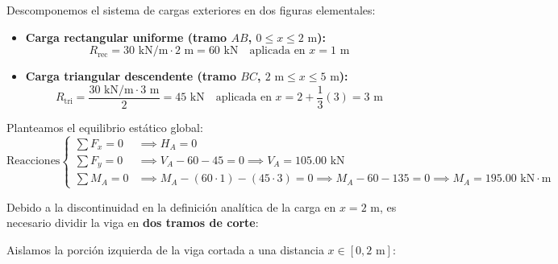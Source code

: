 
Descomponemos el sistema de cargas exteriores en dos figuras elementales:
\begin{itemize}
    \item \textbf{Carga rectangular uniforme (tramo $AB$, $0 \le x \le 2\text{ m}$):}
          \[
              R_{\text{rec}} = 30\text{ kN/m} \cdot 2\text{ m} = 60\text{ kN} \quad \text{aplicada en } x = 1\text{ m}
          \]
    \item \textbf{Carga triangular descendente (tramo $BC$, $2\text{ m} \le x \le 5\text{ m}$):}
          \[
              R_{\text{tri}} = \frac{30\text{ kN/m} \cdot 3\text{ m}}{2} = 45\text{ kN} \quad \text{aplicada en } x = 2 + \frac{1}{3}(3) = 3\text{ m}
          \]
\end{itemize}

Planteamos el equilibrio estático global:
\begin{equation}
    \text{Reacciones} \left\{
    \begin{aligned}
        \sum F_x = 0 & \implies \boxed{H_A = 0}                                                                                                        \\[6pt]
        \sum F_y = 0 & \implies V_A - 60 - 45 = 0 \implies \boxed{V_A = 105.00\text{ kN}}                                                              \\[6pt]
        \sum M_A = 0 & \implies M_A - (60 \cdot 1) - (45 \cdot 3) = 0 \implies M_A - 60 - 135 = 0 \implies \boxed{M_A = 195.00\text{ kN}\cdot\text{m}}
    \end{aligned}
    \right.
\end{equation}


Debido a la discontinuidad en la definición analítica de la carga en $x = 2\text{ m}$, es necesario dividir la viga en \textbf{dos tramos de corte}:


Aislamos la porción izquierda de la viga cortada a una distancia $x \in [0, 2\text{ m}]$:

